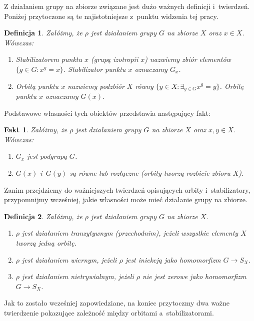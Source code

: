\documentclass[licencjacka]{pracamgr}
\newtheorem{deff}{Definicja}[section]
\newtheorem{fact}{Fakt}[section]
\begin{document}
Z działaniem grupy na zbiorze związane jest dużo ważnych definicji i~twierdzeń.
Poniżej przytoczone są te najistotniejsze z~punktu widzenia tej pracy.

\begin{deff}
	Załóżmy, że $\rho$ jest działaniem grupy $G$ na zbiorze $X$ oraz $x \in X$. Wówczas:
	\begin{enumerate}[label=\alph*)]
	 \item \emph{Stabilizatorem punktu $x$ (grupą izotropii $x$)} nazwiemy zbiór elementów $\{g \in G\colon x^g = x \}$. 
					Stabilizator punktu $x$ oznaczamy $G_x$.
	 \item \emph{Orbitą punktu $x$} nazwiemy podzbiór $X$ równy $\{y \in X \colon \exists_{g \in G} x^g = y \}$.
					Orbitę punktu $x$ oznaczamy $G(x)$.
	\end{enumerate}
\end{deff}

Podstawowe własności tych obiektów przedstawia następujący fakt:
\begin{fact}
	Załóżmy, że $\rho$ jest działaniem grupy $G$ na zbiorze $X$ oraz $x, y \in X$. Wówczas:
	\begin{enumerate}[label=\alph*)]
	 \item $G_x$ jest podgrupą $G$.
	 \item $G(x)$ i~$G(y)$ są równe lub rozłączne (orbity tworzą rozbicie zbioru $X$).
	\end{enumerate}
\end{fact}

Zanim przejdziemy do ważniejszych twierdzeń opisujących orbity i~stabilizatory, 
przypomnijmy wcześniej, jakie własności może mieć działanie grupy na zbiorze.

\begin{deff}
	Załóżmy, że $\rho$ jest działaniem grupy $G$ na zbiorze $X$.
	\begin{enumerate}[label=\alph*)]
	 \item \emph{$\rho$ jest działaniem tranzytywnym (przechodnim)}, jeżeli wszystkie elementy $X$ tworzą jedną orbitę.
	 \item \emph{$\rho$ jest działaniem wiernym}, jeżeli $\rho$ jest iniekcją jako homomorfizm $G \to S_X$.
	 \item \emph{$\rho$ jest działaniem nietrywialnym}, jeżeli $\rho$ nie jest zerowe jako homomorfizm $G \to S_X$.
	\end{enumerate}
\end{deff}

Jak to zostało wcześniej zapowiedziane, na koniec przytoczmy dwa ważne twierdzenie pokazujące zależność między orbitami a~stabilizatorami.
\end{document}

